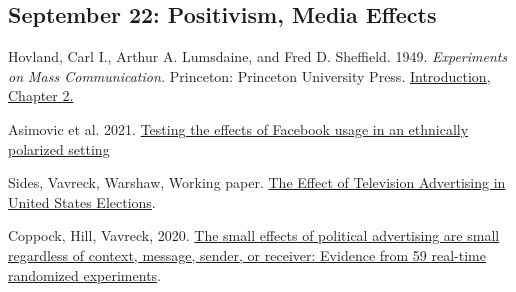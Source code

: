 \vspace{-.1in}\documentclass[11pt]{article}
\begin{document}







\subsection*{September 22: Positivism, Media Effects }


Hovland, Carl I., Arthur A. Lumsdaine, and Fred D. Sheffield. 1949. \emph{Experiments on Mass Communication.} Princeton: Princeton University Press. \href{https://github.com/kmunger/MSMP21/blob/main/hov1.pdf}{Introduction,} \href{https://github.com/kmunger/MSMP21/blob/main/hov2.pdf}{Chapter 2. }


\noindent Asimovic et al. 2021. \href{https://www.pnas.org/content/118/25/e2022819118}{Testing the effects of Facebook usage in an ethnically polarized setting}



\noindent Sides, Vavreck, Warshaw, Working paper. \href{http://chriswarshaw.com/papers/advertising.pdf}{The Effect of Television Advertising in United States Elections}.

\noindent Coppock, Hill, Vavreck, 2020. \href{https://advances.sciencemag.org/content/6/36/eabc4046?intcmp=trendmd-adv}{The small effects of political advertising are small regardless of context, message, sender, or receiver: Evidence from 59 real-time randomized experiments}.
	
\end{document}
